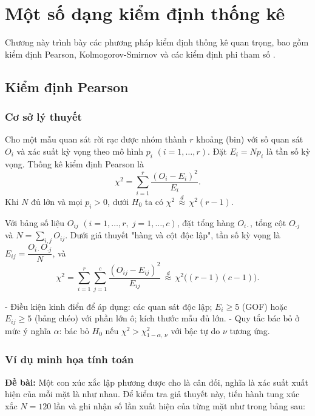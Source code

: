 \chapter{Một số dạng kiểm định thống kê}
Chương này trình bày các phương pháp kiểm định thống kê quan trọng, bao gồm kiểm định Pearson, Kolmogorov-Smirnov và các kiểm định phi tham số \cite{lehmann2005, conover1999, sheskin2011}.

\section{Kiểm định Pearson}

\subsection{Cơ sở lý thuyết}
\begin{dn}
Cho một mẫu quan sát rời rạc được nhóm thành $r$ khoảng (bin) với số quan sát $O_i$ và xác suất kỳ vọng theo mô hình $p_i$ $(i=1,\ldots,r)$. Đặt $E_i=Np_i$ là tần số kỳ vọng. Thống kê kiểm định Pearson là
\[
\chi^2=\sum_{i=1}^{r}\frac{(O_i-E_i)^2}{E_i}.
\]
Khi $N$ đủ lớn và mọi $p_i>0$, dưới $H_0$ ta có $\chi^2\,\overset{d}{\approx}\,\chi^2(r-1)$.
\end{dn}

\begin{dn}
Với bảng số liệu $O_{ij}$ $(i=1,\ldots,r,\; j=1,\ldots,c)$, đặt tổng hàng $O_{i\cdot}$, tổng cột $O_{\cdot j}$ và $N=\sum_{i,j}O_{ij}$. Dưới giả thuyết "hàng và cột độc lập", tần số kỳ vọng là $E_{ij}=\dfrac{O_{i\cdot}O_{\cdot j}}{N}$, và
\[\chi^2=\sum_{i=1}^{r}\sum_{j=1}^{c}\frac{(O_{ij}-E_{ij})^2}{E_{ij}}\,\overset{d}{\approx}\,\chi^2\big((r-1)(c-1)\big).
\]
\end{dn}

\begin{tinhchat}
- Điều kiện kinh điển để áp dụng: các quan sát độc lập; $E_i\ge5$ (GOF) hoặc $E_{ij}\ge5$ (bảng chéo) với phần lớn ô; kích thước mẫu đủ lớn.
- Quy tắc bác bỏ ở mức ý nghĩa $\alpha$: bác bỏ $H_0$ nếu $\chi^2>\chi^2_{1-\alpha,\,\nu}$ với bậc tự do $\nu$ tương ứng.
\end{tinhchat}

\subsection{Ví dụ minh họa tính toán}

\textbf{Đề bài:}  
Một con xúc xắc lập phương được cho là cân đối, nghĩa là xác suất xuất hiện của mỗi mặt là như nhau. Để kiểm tra giả thuyết này, tiến hành tung xúc xắc $N = 120$ lần và ghi nhận số lần xuất hiện của từng mặt như trong bảng sau:  

